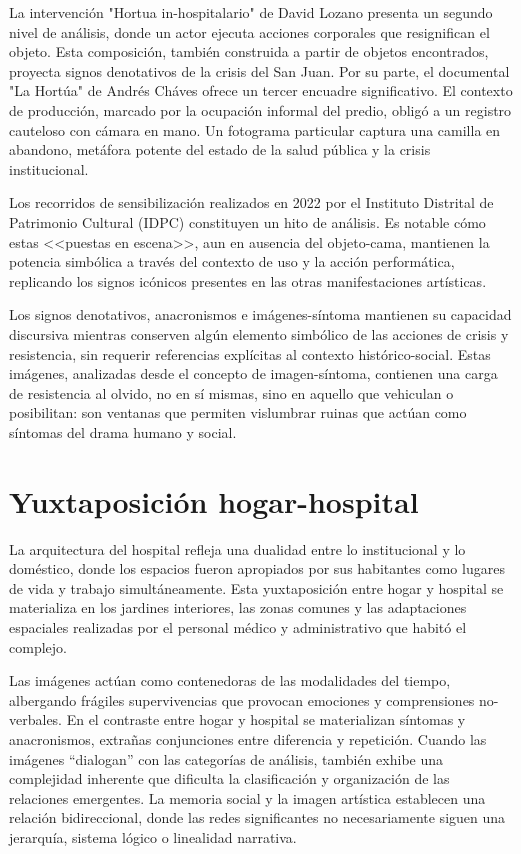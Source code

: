 La intervención "Hortua in-hospitalario" de David Lozano presenta un segundo nivel de análisis, donde un actor ejecuta acciones corporales que resignifican el objeto. Esta composición, también construida a partir de objetos encontrados, proyecta signos denotativos de la crisis del San Juan. Por su parte, el documental "La Hortúa" de Andrés Cháves ofrece un tercer encuadre significativo. El contexto de producción, marcado por la ocupación informal del predio, obligó a un registro cauteloso con cámara en mano. Un fotograma particular captura una camilla en abandono, metáfora potente del estado de la salud pública y la crisis institucional.

Los recorridos de sensibilización realizados en 2022 por el Instituto Distrital de Patrimonio Cultural (IDPC) constituyen un hito de análisis. Es notable cómo estas <<puestas en escena>>, aun en ausencia del objeto-cama, mantienen la potencia simbólica a través del contexto de uso y la acción performática, replicando los signos icónicos presentes en las otras manifestaciones artísticas.

Los signos denotativos, anacronismos e imágenes-síntoma mantienen su capacidad discursiva mientras conserven algún elemento simbólico de las acciones de crisis y resistencia, sin requerir referencias explícitas al contexto histórico-social. Estas imágenes, analizadas desde el concepto de imagen-síntoma, contienen una carga de resistencia al olvido, no en sí mismas, sino en aquello que vehiculan o posibilitan: son ventanas que permiten vislumbrar ruinas que actúan como síntomas del drama humano y social.

\section{Yuxtaposición hogar-hospital}

La arquitectura del hospital refleja una dualidad entre lo institucional y lo doméstico, donde los espacios fueron apropiados por sus habitantes como lugares de vida y trabajo simultáneamente. Esta yuxtaposición entre hogar y hospital se materializa en los jardines interiores, las zonas comunes y las adaptaciones espaciales realizadas por el personal médico y administrativo que habitó el complejo.

Las imágenes actúan como contenedoras de las modalidades del tiempo, albergando frágiles supervivencias que provocan emociones y comprensiones no-verbales. En el contraste entre hogar y hospital se materializan síntomas y anacronismos, extrañas conjunciones entre diferencia y repetición. Cuando las imágenes ``dialogan'' con las categorías de análisis, también exhibe una complejidad inherente que dificulta la clasificación y organización de las relaciones emergentes. La memoria social y la imagen artística establecen una relación bidireccional, donde las redes significantes no necesariamente siguen una jerarquía, sistema lógico o linealidad narrativa.